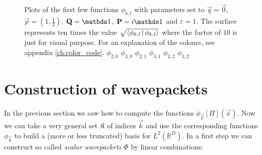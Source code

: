 \begin{figure}
{  } \\
   \\
  \caption[Plots of some basis functions $\phi$]{
    Plots of the first few functions $\phi_{k,l}$ with parameters set
    to $\vec{q} = \vec{0}$, $\vec{p} = (1, \frac{1}{2})$, $\mat{Q} = \id$, $\mat{P} = i \id$
    and $\varepsilon = 1$. The surface represents ten times the value
    $\sqrt{\Braket{\phi_{k,l}|\phi_{k,l}}}$ where the factor of $10$
    is just for visual purpose. For an explanation of the colours, see appendix \ref{ch:color_code}.
     $\phi_{2,0}$
     $\phi_{3,0}$
     $\phi_{2,1}$
     $\phi_{3,1}$
     $\phi_{2,2}$
     $\phi_{3,2}$
    \label{fig:phi_table_2}
  }
\end{figure}


\section{Construction of wavepackets}


In the previous section we saw how to compute the functions $\phi_{\vec{k}}[\Pi](\vec{x})$.
Now we can take a very general set $\mathfrak{K}$ of indices $\vec{k}$ and use
the corresponding functions $\phi_{\vec{k}}$ to build a (more or less truncated)
basis for $L^2(\mathbb{R}^D)$. In a first step we can construct so called
\emph{scalar wavepackets} $\Phi$ by linear combinations:

